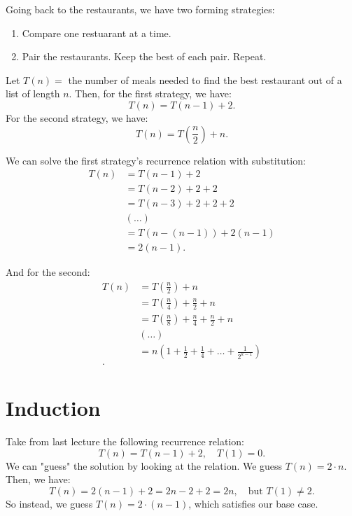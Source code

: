 \documentclass[a4paper]{article}
\begin{document}
\begin{eg}
	Going back to the restaurants, we have two forming strategies:
	\begin{enumerate}
		\item Compare one restuarant at a time.
		\item Pair the restaurants. Keep the best of each pair. Repeat.
	\end{enumerate}
	Let \( T(n) =  \) the number of meals needed to find the best restaurant out of a list of length \( n \). Then, for the first strategy, we have: \[
		T(n) = T(n - 1) + 2
		.\] For the second strategy, we have: \[
			T(n) = T\left(\frac{n}{2}\right) + n
		.\] 

	We can solve the first strategy's recurrence relation with substitution:
	\begin{align*}
		T(n) & = T(n- 1) + 2 \\
					& = T(n-2) + 2 + 2 \\
					& = T(n-3) + 2 + 2 + 2 \\
					& (\ldots) \\
					& = T(n - (n - 1)) + 2(n - 1) \\
					& = 2(n - 1) \tag{\( T(1) = 0 \)}
	.\end{align*}

	And for the second:
	\begin{align*}
		T(n) &= T\left(\frac{n}{2}\right) + n \\
					&= T\left(\frac{n}{4}\right) + \frac{n}{2} + n \\
					&= T\left(\frac{n}{8}\right) + \frac{n}{4} + \frac{n}{2} + n \\
					&(\ldots ) \\
					&=n\left(1 + \frac{1}{2} + \frac{1}{4} + \ldots + \frac{1}{2^{k-1}}\right) \\
	.\end{align*}
\end{eg}


\section{Induction}

\begin{eg}
	Take from last lecture the following recurrence relation: \[
		T(n) = T(n - 1) + 2, \quad T(1) = 0
	.\] 
	We can "guess" the solution by looking at the relation. We guess \( T(n) = 2 \cdot n \). Then, we have: \[
		T(n) = 2(n - 1) + 2 = 2n - 2 + 2 = 2n, \quad \text{but } T(1) \neq  2
	.\] 
	So instead, we guess \( T(n) = 2 \cdot (n-1) \), which satisfies our base case.
\end{eg}
\end{document}
